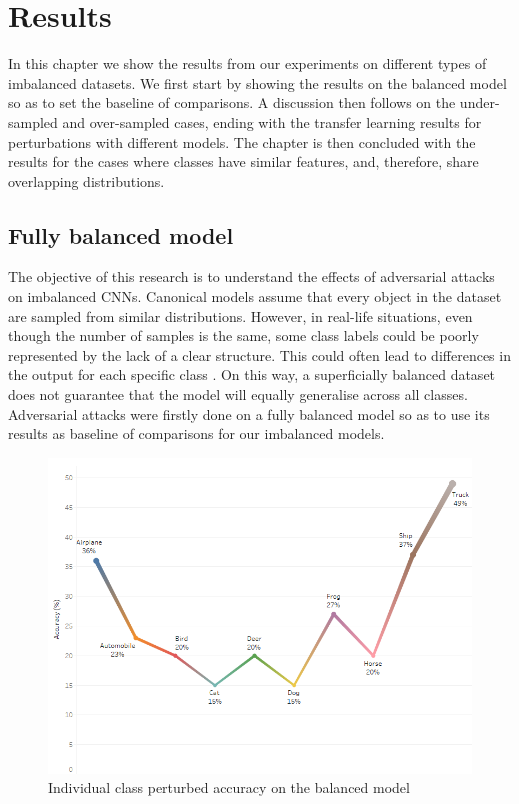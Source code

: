

\chapter{Results}
In this chapter we show the results from our experiments on different types of imbalanced datasets. We first start by showing the results on the balanced model so as to set the baseline of comparisons. A discussion then follows on the under-sampled and over-sampled cases, ending with the transfer learning results for perturbations with different models. The chapter is then concluded with the results for the cases where classes have similar features, and, therefore, share overlapping distributions.


\section{Fully balanced model}

The objective of this research is to understand the effects of adversarial attacks on imbalanced CNNs. Canonical models assume that every object in the dataset are sampled from similar distributions. However, in real-life situations, even though the number of samples is the same, some class labels could be poorly represented by the lack of a clear structure. This could often lead to differences in the output for each specific class \cite{krawczyk2016learning}. On this way, a superficially balanced dataset does not guarantee that the model will equally generalise across all classes. Adversarial attacks were firstly done on a fully balanced model so as to use its results as baseline of comparisons for our imbalanced models.
\begin{figure}[H]
	\centering
	\includegraphics[scale=0.7]{balanced_perturbed.png}
	\caption{Individual class perturbed accuracy on the balanced model}
	\label{fig:balanced_perturbed}
\end{figure}

